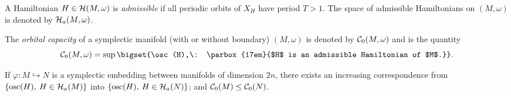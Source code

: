 \documentclass[../main-v2-manifolds.tex]{subfiles}
\begin{document}
\begin{definition}
    A Hamiltonian $H\in \mathcal{H}(M,\omega)$ is \emph{admissible} if all periodic orbits of $X_H$ have period $T > 1$. The space of admissible Hamiltonians on $(M,\omega)$ is denoted by $\mathcal{H}_a(M,\omega)$.
\end{definition}
\begin{definition}
    The \emph{orbital capacity} of a symplectic manifold (with or without boundary) $(M,\omega)$ is denoted by $\mathcal{C}_0(M,\omega)$ and is the quantity
    \[
        \frakc_0(M,\omega) = \sup\bigset{\osc(H),\: \parbox{17em}{$H$ is an admissible Hamiltonian of $M$.}}.
    \]
\end{definition}
\begin{wts}
    If $\varphi: M\hookrightarrow N$ is a symplectic embedding between manifolds of dimension $2n$, there exists an increasing correspondence from $\{\mathrm{osc}(H),\: H\in\mathcal{H}_a(M)\}$ into $\{\mathrm{osc}(H),\: H\in\mathcal{H}_a(N)\}$; and $\mathcal{C}_0(M)\leq \mathcal{C}_0(N)$.
\end{wts}
\end{document}
